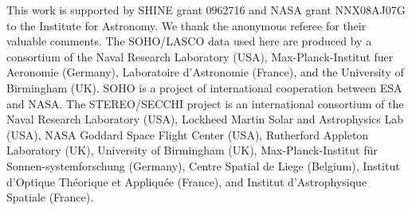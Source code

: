 \documentclass[preprint2]{aastex}
\begin{document}


\acknowledgments

This work is supported by SHINE grant 0962716 and NASA grant NNX08AJ07G to the Institute for Astronomy. We thank the anonymous referee for their valuable comments. The SOHO/LASCO data used here are produced by a consortium of the Naval Research Laboratory (USA), Max-Planck-Institut fuer Aeronomie (Germany), Laboratoire d'Astronomie (France), and the University of Birmingham (UK). SOHO is a project of international cooperation between ESA and NASA. The STEREO/SECCHI project is an international consortium of the Naval Research Laboratory (USA), Lockheed Martin Solar and Astrophysics Lab (USA), NASA Goddard Space Flight Center (USA), Rutherford Appleton Laboratory (UK), University of Birmingham (UK), Max-Planck-Institut f\"{u}r Sonnen-systemforschung (Germany), Centre Spatial de Liege (Belgium), Institut d'Optique Th\'{e}orique et Appliqu\'{e}e (France), and Institut d'Astrophysique Spatiale (France). 




\end{document}
